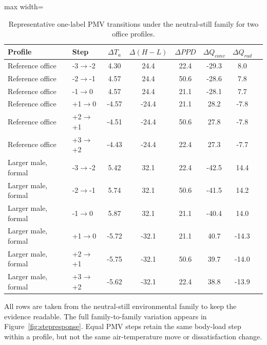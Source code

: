 \begin{table}[t]
\centering
\caption{Representative one-label PMV transitions under the neutral-still family for two office profiles.}
\label{tab:stepsummary}
\begin{adjustbox}{max width=\textwidth}
\begin{tabular}{p{3.0cm}p{1.0cm}cccccc}
\toprule
Profile & Step & $\Delta T_a$ & $\Delta(H-L)$ & $\Delta PPD$ & $\Delta Q_{conv}$ & $\Delta Q_{rad}$ \\
\midrule
Reference office & -3$\rightarrow$-2 & 4.30 & 24.4 & 22.4 & -29.3 & 8.0 \\
Reference office & -2$\rightarrow$-1 & 4.57 & 24.4 & 50.6 & -28.6 & 7.8 \\
Reference office & -1$\rightarrow$0 & 4.57 & 24.4 & 21.1 & -28.1 & 7.7 \\
Reference office & +1$\rightarrow$0 & -4.57 & -24.4 & 21.1 & 28.2 & -7.8 \\
Reference office & +2$\rightarrow$+1 & -4.51 & -24.4 & 50.6 & 27.8 & -7.8 \\
Reference office & +3$\rightarrow$+2 & -4.43 & -24.4 & 22.4 & 27.3 & -7.7 \\
Larger male, formal & -3$\rightarrow$-2 & 5.42 & 32.1 & 22.4 & -42.5 & 14.4 \\
Larger male, formal & -2$\rightarrow$-1 & 5.74 & 32.1 & 50.6 & -41.5 & 14.2 \\
Larger male, formal & -1$\rightarrow$0 & 5.87 & 32.1 & 21.1 & -40.4 & 14.0 \\
Larger male, formal & +1$\rightarrow$0 & -5.72 & -32.1 & 21.1 & 40.7 & -14.3 \\
Larger male, formal & +2$\rightarrow$+1 & -5.75 & -32.1 & 50.6 & 39.7 & -14.0 \\
Larger male, formal & +3$\rightarrow$+2 & -5.62 & -32.1 & 22.4 & 38.8 & -13.9 \\
\bottomrule
\end{tabular}
\end{adjustbox}
\begin{flushleft}\footnotesize All rows are taken from the neutral-still environmental family to keep the evidence readable. The full family-to-family variation appears in Figure~\ref{fig:stepresponse}. Equal PMV steps retain the same body-load step within a profile, but not the same air-temperature move or dissatisfaction change.\end{flushleft}
\end{table}
